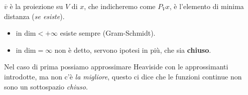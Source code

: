 \documentclass[10pt,a4paper,twoside,openright]{book}
\begin{document}
\begin{figure}[htpb]
	
\end{figure}
\FloatBarrier

$\displaystyle \overline{v}$ è la proiezione su $V$ di $x$, che indicheremo come $P_{V} x$, è l'elemento di minima distanza (\textit{se esiste}).
\begin{itemize}
	\item in $\mathrm{dim} < +\infty $ esiste sempre (Gram-Schmidt).
	\item in $\mathrm{dim} =\infty $ non è detto, servono ipotesi in più, che sia \textbf{chiuso}.
\end{itemize}

Nel caso di prima possiamo approssimare Heaviside con le approssimanti introdotte, ma non c'è \textit{la migliore}, questo ci dice che le funzioni continue non sono un sottospazio \textit{chiuso}.
\end{document}
